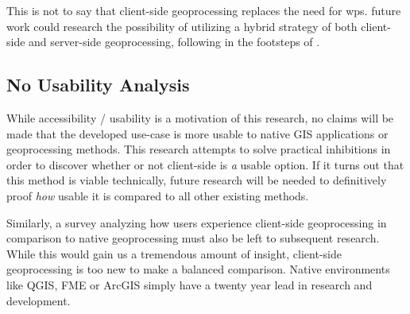 This is not to say that client-side geoprocessing replaces the need for \ac{wps}. 
future work could research the possibility of utilizing a hybrid strategy of both client-side and server-side geoprocessing, following in the footsteps of \cite{panidi_hybrid_2015}. 



\subsection*{ No Usability Analysis } %
While accessibility / usability is a motivation of this research, no claims will be made that the developed use-case is more usable to native GIS applications or geoprocessing methods. This research attempts to solve practical inhibitions in order to discover whether or not client-side is \emph{a} usable option. If it turns out that this method is viable technically, future research will be needed to definitively proof \emph{how} usable it is compared to all other existing methods.  


Similarly, a survey analyzing how users experience client-side geoprocessing in comparison to native geoprocessing must also be left to subsequent research. While this would gain us a tremendous amount of insight, client-side geoprocessing is too new to make a balanced comparison. Native environments like QGIS, FME or ArcGIS simply have a twenty year lead in research and development. 









